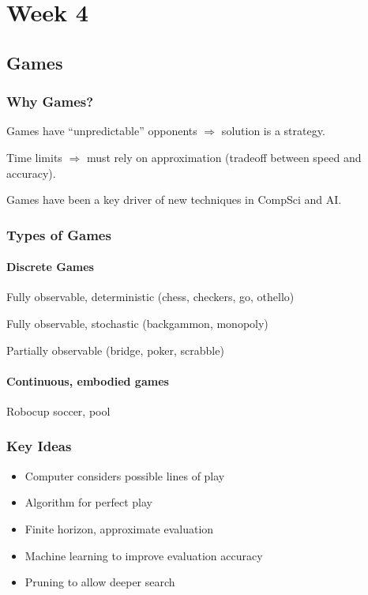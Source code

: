 \part{Week 4}
\chapter{Games}

\section{Why Games?}
Games have ``unpredictable'' opponents $\Rightarrow$ solution is a strategy.

Time limits $\Rightarrow$ must rely on approximation (tradeoff between speed
and accuracy).

Games have been a key driver of new techniques in CompSci and AI.

\section{Types of Games}
\subsection{Discrete Games}
Fully observable, deterministic (chess, checkers, go, othello)

Fully observable, stochastic (backgammon, monopoly)

Partially observable (bridge, poker, scrabble)

\subsection{Continuous, embodied games}
Robocup soccer, pool

\section{Key Ideas}
\begin{itemize}
    \item Computer considers possible lines of play
    \item Algorithm for perfect play
    \item Finite horizon, approximate evaluation
    \item Machine learning to improve evaluation accuracy
    \item Pruning to allow deeper search
\end{itemize}


